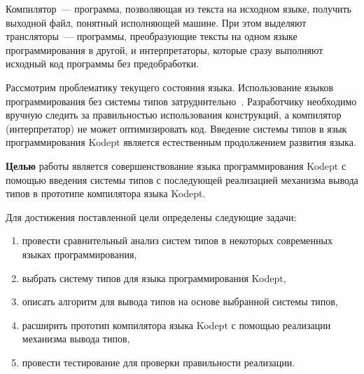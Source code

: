 Компилятор~--- программа, позволяющая из текста на исходном языке, получить выходной файл, понятный исполняющей машине.
При этом выделяют трансляторы~--- программы, преобразующие тексты на одном языке программирования в другой, и интерпретаторы, которые сразу выполняют исходный код программы без предобработки.

Рассмотрим проблематику текущего состояния языка.
Использование языков программирования без системы типов затруднительно~\cite{Typing}.
Разработчику необходимо вручную следить за правильностью использования конструкций, а компилятор (интерпретатор) не может оптимизировать код.
Введение системы типов в язык программирования Kodept является естественным продолжением развития языка.

\textbf{Целью} работы является совершенствование языка программирования Kodept с помощью введения системы типов с последующей реализацией механизма вывода типов в прототипе компилятора языка Kodept.

Для достижения поставленной цели определены следующие задачи:

\begin{enumerate}[1)]
    \item провести сравнительный анализ систем типов в некоторых современных языках программирования,
    \item выбрать систему типов для языка программирования Kodept,
    \item описать алгоритм для вывода типов на основе выбранной системы типов,
    \item расширить прототип компилятора языка Kodept с помощью реализации механизма вывода типов,
    \item провести тестирование для проверки правильности реализации.
\end{enumerate}


